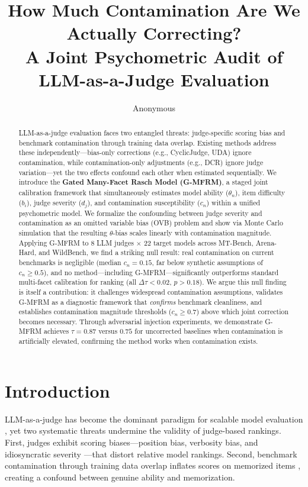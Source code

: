 \documentclass[11pt]{article}
\title{How Much Contamination Are We Actually Correcting? \\
A Joint Psychometric Audit of LLM-as-a-Judge Evaluation}
\author{Anonymous}
\begin{document}
\maketitle

\begin{abstract}
LLM-as-a-judge evaluation faces two entangled threats: judge-specific scoring bias and benchmark contamination through training data overlap.
Existing methods address these independently---bias-only corrections (e.g., CyclicJudge, UDA) ignore contamination, while contamination-only adjustments (e.g., DCR) ignore judge variation---yet the two effects confound each other when estimated sequentially.
We introduce the \textbf{Gated Many-Facet Rasch Model (G-MFRM)}, a staged joint calibration framework that simultaneously estimates model ability ($\theta_n$), item difficulty ($b_i$), judge severity ($d_j$), and contamination susceptibility ($c_n$) within a unified psychometric model.
We formalize the confounding between judge severity and contamination as an omitted variable bias (OVB) problem and show via Monte Carlo simulation that the resulting $\theta$-bias scales linearly with contamination magnitude.
Applying G-MFRM to 8 LLM judges $\times$ 22 target models across MT-Bench, Arena-Hard, and WildBench, we find a striking null result: real contamination on current benchmarks is negligible (median $c_n = 0.15$, far below synthetic assumptions of $c_n \geq 0.5$), and no method---including G-MFRM---significantly outperforms standard multi-facet calibration for ranking (all $\Delta\tau < 0.02$, $p > 0.18$).
We argue this null finding is itself a contribution: it challenges widespread contamination assumptions, validates G-MFRM as a diagnostic framework that \emph{confirms} benchmark cleanliness, and establishes contamination magnitude thresholds ($c_n \geq 0.7$) above which joint correction becomes necessary.
Through adversarial injection experiments, we demonstrate G-MFRM achieves $\tau = 0.87$ versus $0.75$ for uncorrected baselines when contamination is artificially elevated, confirming the method works when contamination exists.
\end{abstract}

\section{Introduction}

LLM-as-a-judge has become the dominant paradigm for scalable model evaluation \cite{zheng2023judging}, yet two systematic threats undermine the validity of judge-based rankings.
First, judges exhibit scoring biases---position bias, verbosity bias, and idiosyncratic severity \cite{wang2023large}---that distort relative model rankings.
Second, benchmark contamination through training data overlap inflates scores on memorized items \cite{golchin2023time,shi2023detecting}, creating a confound between genuine ability and memorization.
\end{document}
